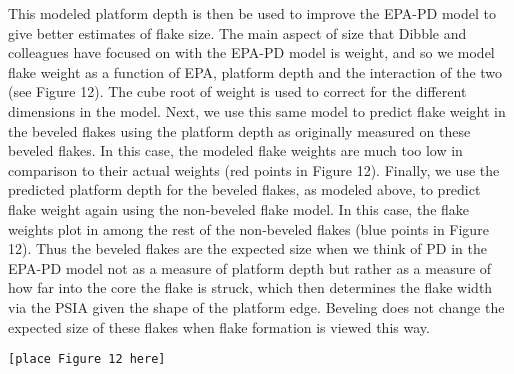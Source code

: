 \documentclass[10pt,letterpaper]{article}
\begin{document}
This modeled platform depth is then be used to improve the EPA-PD model
to give better estimates of flake size. The main aspect of size that
Dibble and colleagues have focused on with the EPA-PD model is weight,
and so we model flake weight as a function of EPA, platform depth and
the interaction of the two (see Figure 12). The cube root of weight is
used to correct for the different dimensions in the model. Next, we use
this same model to predict flake weight in the beveled flakes using the
platform depth as originally measured on these beveled flakes. In this
case, the modeled flake weights are much too low in comparison to their
actual weights (red points in Figure 12). Finally, we use the predicted
platform depth for the beveled flakes, as modeled above, to predict
flake weight again using the non-beveled flake model. In this case, the
flake weights plot in among the rest of the non-beveled flakes (blue
points in Figure 12). Thus the beveled flakes are the expected size when
we think of PD in the EPA-PD model not as a measure of platform depth
but rather as a measure of how far into the core the flake is struck,
which then determines the flake width via the PSIA given the shape of
the platform edge. Beveling does not change the expected size of these
flakes when flake formation is viewed this way.

\begin{verbatim}
[place Figure 12 here]
\end{verbatim}
\end{document}
